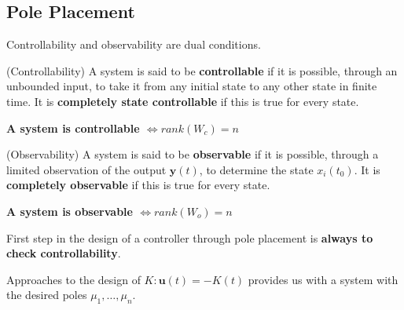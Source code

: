 \documentclass[a4paper]{report}
\begin{document}
\subsection*{Pole Placement}

Controllability and observability are dual conditions.

\begin{definition}
    (Controllability) A system is said to be \textbf{controllable} if it is possible, through an unbounded input, to take it from any initial state to any other state in finite time. It is \textbf{completely state controllable} if this is true for every state.

    \textbf{A system is controllable $\iff rank\left( W_c \right) = n$}
\end{definition}

\begin{definition}
    (Observability) A system is said to be \textbf{observable} if it is possible, through a limited observation of the output $\bm{y}(t)$, to determine the state $x_i(t_0)$. It is \textbf{completely observable} if this is true for every state.

    \textbf{A system is observable $\iff rank\left( W_o \right) = n$}
\end{definition}

\begin{note}
    First step in the design of a controller through pole placement is \textbf{always to check controllability}.
\end{note}

Approaches to the design of $K : \bm{u}(t) = -K\bm{}(t)$ provides us with a system with the desired poles $\mu_1,\ldots,\mu_n$.
\end{document}
